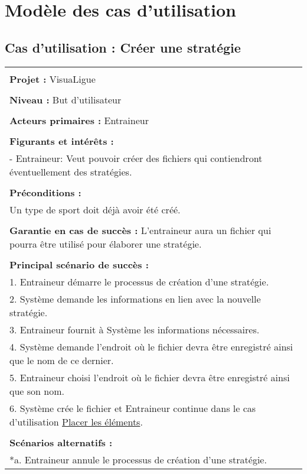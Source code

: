 \chapter{Modèle des cas d'utilisation}
\label{s:use_cases}


\section{Cas d'utilisation : Créer une stratégie}
\begin{longtable}{|p{16cm}|}
	\hline
	\\
	\textbf{Projet :} VisuaLigue\\
	\\
	\textbf{Niveau :} But d'utilisateur\\
	\\
	\textbf{Acteurs primaires :} Entraineur\\
	\\
	\textbf{Figurants et intérêts :} \\
	- Entraineur: Veut pouvoir créer des fichiers qui contiendront éventuellement des stratégies.\\
	\\
	\textbf{Préconditions :} \\
	Un type de sport doit déjà avoir été créé. \\
	\\
	\textbf{Garantie en cas de succès :} L'entraineur aura un fichier qui pourra être utilisé pour élaborer une stratégie.\\
	\\
	\textbf{Principal scénario de succès :}\\
	1. Entraineur démarre le processus de création d'une stratégie.\\
	2. Système demande les informations en lien avec la nouvelle stratégie.\\
	3. Entraineur fournit à Système les informations nécessaires.\\
	4. Système demande l'endroit où le fichier devra être enregistré ainsi que le nom de ce dernier.\\
	5. Entraineur choisi l'endroit où le fichier devra être enregistré ainsi que son nom.\\
	6. Système crée le fichier et Entraineur continue dans le cas d'utilisation \underline{Placer les éléments}.\\
	\\
	\textbf{Scénarios alternatifs :}\\
	*a. Entraineur annule le processus de création d'une stratégie.\\

\end{longtable}
